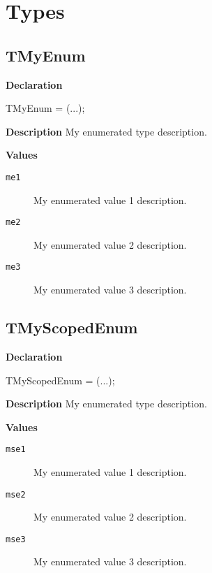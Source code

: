 \documentclass{report}
\begin{document}
\section{Types}
\subsection*{TMyEnum}
\begin{list}{}{
\setlength{\itemindent}{0cm}
\setlength{\listparindent}{0cm}
\setlength{\leftmargin}{\evensidemargin}
\addtolength{\leftmargin}{\tmplength}
\settowidth{\labelsep}{X}
\addtolength{\leftmargin}{\labelsep}
\setlength{\labelwidth}{\tmplength}
}
\begin{flushleft}
\item[\textbf{Declaration}\hfill]
\begin{ttfamily}
TMyEnum = (...);\end{ttfamily}


\end{flushleft}
\par
\item[\textbf{Description}]
My enumerated type description.\item[\textbf{Values}]
\begin{description}
\item[\texttt{me1}] My enumerated value 1 description.
\item[\texttt{me2}] My enumerated value 2 description.
\item[\texttt{me3}] My enumerated value 3 description.
\end{description}


\end{list}
\subsection*{TMyScopedEnum}
\begin{list}{}{
\setlength{\itemindent}{0cm}
\setlength{\listparindent}{0cm}
\setlength{\leftmargin}{\evensidemargin}
\addtolength{\leftmargin}{\tmplength}
\settowidth{\labelsep}{X}
\addtolength{\leftmargin}{\labelsep}
\setlength{\labelwidth}{\tmplength}
}
\begin{flushleft}
\item[\textbf{Declaration}\hfill]
\begin{ttfamily}
TMyScopedEnum = (...);\end{ttfamily}


\end{flushleft}
\par
\item[\textbf{Description}]
My enumerated type description.\item[\textbf{Values}]
\begin{description}
\item[\texttt{mse1}] My enumerated value 1 description.
\item[\texttt{mse2}] My enumerated value 2 description.
\item[\texttt{mse3}] My enumerated value 3 description.
\end{description}


\end{list}
\end{document}
